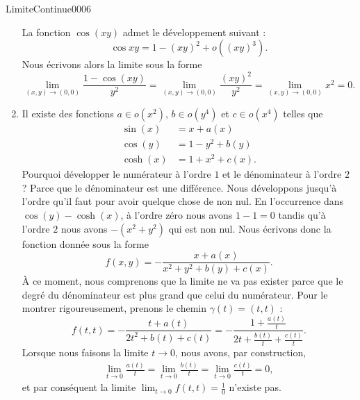 \begin{corrige}{LimiteContinue0006}
\begin{enumerate}
          La fonction $\cos(xy)$  admet le développement suivant : 
          \[
          \cos xy= 1-(xy)^2+o((xy)^3).
          \]
          Nous écrivons alors la limite sous la forme
          \begin{equation}
            \lim_{(x,y)\to (0,0)} \frac{1-\cos(xy)}{y^2}=\lim_{(x,y)\to (0,0)} \frac{(xy)^2}{y^2}=\lim_{(x,y)\to (0,0)} x^2=0.
          \end{equation}
       \item
		Il existe des fonctions $a\in o(x^2)$, $b\in o(y^4)$ et $c\in o(x^4)$ telles que
		\begin{subequations}
			\begin{align}
				\sin(x)&=x+a(x)\\
				\cos(y)&=1-y^2+b(y)\\
				\cosh(x)&=1+x^2+c(x).
			\end{align}
		\end{subequations}
		Pourquoi développer le numérateur à l'ordre $1$ et le dénominateur à l'ordre $2$ ? Parce que le dénominateur est une différence. Nous développons jusqu'à l'ordre qu'il faut pour avoir quelque chose de non nul. En l'occurrence dans $\cos(y)-\cosh(x)$, à l'ordre zéro nous avons $1-1=0$ tandis qu'à l'ordre $2$ nous avons $-(x^2+y^2)$ qui est non nul. Nous écrivons donc la fonction donnée sous la forme
		\begin{equation}
			f(x,y)=-\frac{ x+a(x) }{ x^2+y^2+b(y)+c(x) }.
		\end{equation}
		À ce moment, nous comprenons que la limite ne va pas exister parce que le degré du dénominateur est plus grand que celui du numérateur. Pour le montrer rigoureusement, prenons le chemin $\gamma(t)=(t,t)$ :
		\begin{equation}
			f(t,t)=-\frac{ t+a(t) }{ 2t^2+b(t)+c(t) }=-\frac{ 1+\frac{ a(t) }{ t } }{ 2t+\frac{ b(t) }{ t }+\frac{ c(t) }{ t } }.
		\end{equation}
		Lorsque nous faisons la limite $t\to 0$, nous avons, par construction, 
		\begin{subequations}
			\begin{align}
				\lim_{t\to 0}\frac{ a(t) }{ t }=\lim_{t\to 0} \frac{ b(t) }{ t }=\lim_{t\to 0} \frac{ c(t) }{ t }=0,
			\end{align}
		\end{subequations}
		et par conséquent la limite $\lim_{t\to 0} f(t,t)=\frac{1}{ 0 }$ n'existe pas.
          
  \end{enumerate}


\end{corrige}
